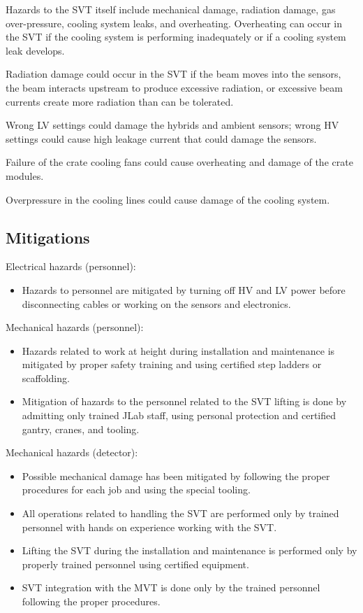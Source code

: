 Hazards to the SVT itself include mechanical damage, radiation damage, gas over-pressure, 
cooling system leaks, and overheating. Overheating can occur in the SVT  if the cooling 
system is performing inadequately or if a cooling system leak develops.

Radiation damage could occur in the SVT if the beam moves into the sensors, the beam interacts 
upstream to produce excessive radiation, or excessive beam currents create more radiation than 
can be tolerated. 

Wrong LV settings could damage the hybrids and ambient sensors; wrong HV settings could cause 
high leakage current that could damage the sensors.

Failure of the crate cooling fans could cause overheating and damage of the crate modules.

Overpressure in the cooling lines could cause damage of the cooling system.

\subsection{Mitigations}

Electrical hazards (personnel):
\begin{itemize}
\item Hazards to personnel are mitigated by turning off HV and LV power before disconnecting 
cables or working on the sensors and electronics. 
\end{itemize}

Mechanical hazards (personnel):
\begin{itemize}
\item Hazards related to work at height during installation and maintenance is mitigated by 
proper safety training and using certified step ladders or scaffolding. 
\item Mitigation of hazards to the personnel related to the SVT lifting is done by admitting 
only trained JLab staff, using personal protection and certified gantry, cranes, and tooling.
\end{itemize}

Mechanical hazards (detector):
\begin{itemize}
\item Possible mechanical damage has been mitigated by following the proper procedures for each 
job and using the special tooling. 
\item All operations related to handling the SVT are performed only by trained personnel with 
hands on experience working with the SVT. 
\item Lifting the SVT during the installation and maintenance is performed only by properly 
trained personnel using certified equipment. 
\item SVT integration with the MVT is done only by the trained personnel following the proper 
procedures. 
\end{itemize}


